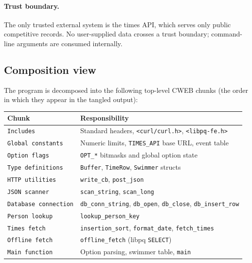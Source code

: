 \documentclass[12pt]{article}
\newcommand{\code}[1]{\texttt{#1}}
\begin{document}
\begin{description}[style=nextline]
\paragraph{Trust boundary.}
The only trusted external system is the times API, which
serves only public competitive records.  No user-supplied data
crosses a trust boundary; command-line arguments are consumed
internally.

\subsection{Composition view}

The program is decomposed into the following top-level CWEB
chunks (the order in which they appear in the tangled output):

\begin{center}
\begin{longtable}{ll}
  \toprule
  \textbf{Chunk} & \textbf{Responsibility} \\
  \midrule\endhead
  \code{Includes}                 & Standard headers, \code{<curl/curl.h>}, \code{<libpq-fe.h>} \\
  \code{Global constants}         & Numeric limits, \code{TIMES\_API} base URL, event table \\
  \code{Option flags}             & \code{OPT\_*} bitmasks and global option state \\
  \code{Type definitions}         & \code{Buffer}, \code{TimeRow}, \code{Swimmer}
                                    structs                                          \\
  \code{HTTP utilities}           & \code{write\_cb}, \code{post\_json}            \\
  \code{JSON scanner}             & \code{scan\_string}, \code{scan\_long}         \\
  \code{Database connection}      & \code{db\_conn\_string}, \code{db\_open},
                                    \code{db\_close}, \code{db\_insert\_row}        \\
  \code{Person lookup}            & \code{lookup\_person\_key}                     \\
  \code{Times fetch}              & \code{insertion\_sort}, \code{format\_date},
                                    \code{fetch\_times}                            \\
  \code{Offline fetch}            & \code{offline\_fetch} (libpq \code{SELECT})    \\
  \code{Main function}            & Option parsing, swimmer table, \code{main}     \\
  \bottomrule
\end{longtable}
\end{center}


\end{description}
\end{document}
